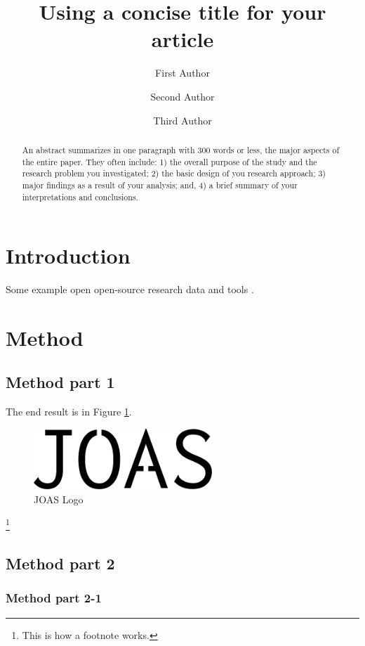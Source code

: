 \documentclass[
  manuscript=article,  %
  layout=preprint,  %
  year=20xx,
  volume=x,
]{extra/joas}
\title{Using a concise title for your article}
\author{First Author}
\affiliation{Institution-1, City, Country}
\author{Second Author}
\affiliation{Institution-2, City, Country}
\author{Third Author}
\affiliation{Institution-3, City, Country}
\begin{document}
\begin{abstract}
  An abstract summarizes in one paragraph with 300 words or less, the major aspects of the entire paper. They often include: 1) the overall purpose of the study and the research problem you investigated; 2) the basic design of you research approach; 3) major findings as a result of your analysis; and, 4) a brief summary of your interpretations and conclusions. 
\end{abstract}


\section{Introduction}

\blindtext 
Some example open open-source research data \cite{schafer2014bringing} and tools \cite{olive2019traffic}. 


\blindtext [2]


\section{Method}

\subsection{Method part 1}

\blindtext The end result is in Figure \ref{fig:logo}.

\begin{figure}[ht!]
  \centering
  \includegraphics[width=0.6\textwidth]{figures/joas-logo.pdf}
  \caption{JOAS Logo}
  \label{fig:logo}
\end{figure}

\blindtext\footnote{This is how a footnote works.}

\subsection{Method part 2}

\subsubsection{Method part 2-1}
\end{document}
